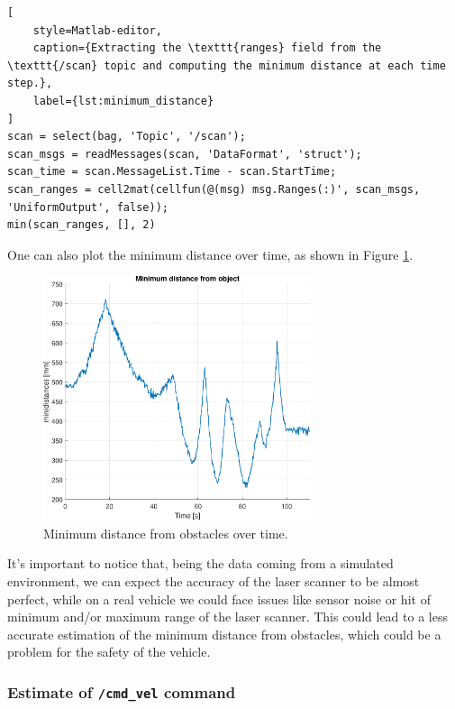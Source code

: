 \begin{lstlisting}[
    style=Matlab-editor,
    caption={Extracting the \texttt{ranges} field from the \texttt{/scan} topic and computing the minimum distance at each time step.},
    label={lst:minimum_distance}
]
scan = select(bag, 'Topic', '/scan');
scan_msgs = readMessages(scan, 'DataFormat', 'struct');
scan_time = scan.MessageList.Time - scan.StartTime;
scan_ranges = cell2mat(cellfun(@(msg) msg.Ranges(:)', scan_msgs, 'UniformOutput', false));
min(scan_ranges, [], 2)
\end{lstlisting}

One can also plot the minimum distance over time, as shown in Figure \ref{fig:minimum_distance}.

\begin{figure}[H]
    \centering
    \includegraphics[width=0.7\textwidth]{./img/MATLAB/minimum_distance.pdf}
    \caption{Minimum distance from obstacles over time.}
    \label{fig:minimum_distance}
\end{figure}

It's important to notice that, being the data coming from a simulated environment, we can expect the accuracy of the laser scanner to be almost perfect, while on a real vehicle we could face issues like sensor noise or hit of minimum and/or maximum range of the laser scanner.
This could lead to a less accurate estimation of the minimum distance from obstacles, which could be a problem for the safety of the vehicle.


\subsubsection{Estimate of \texttt{/cmd\_vel} command}
\label{subsubsec:cmd_vel}

